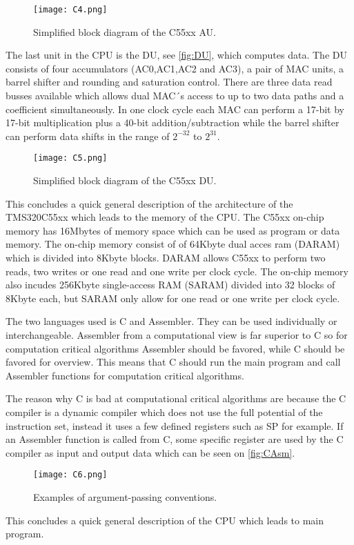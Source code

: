 \begin{figure}[H]
\centering
\texttt{[image: C4.png]}
\label{fig:AU}
\caption{Simplified block diagram of the C55xx AU.}
\end{figure}
The last unit in the CPU is the DU, see \autoref{fig:DU}, which computes data. The DU consists of four accumulators (AC0,AC1,AC2 and AC3), a pair of MAC units, a barrel shifter and rounding and saturation control. There are three data read busses available which allows dual MAC´s access to up to two data paths and a coefficient simultaneously. In one clock cycle each MAC can perform a 17-bit by 17-bit multiplication plus a 40-bit addition/subtraction while the barrel shifter can perform data shifts in the range of $2^{-32}$ to $2^{31}$. 
\begin{figure}[H]
\centering
\texttt{[image: C5.png]}
\label{fig:DU}
\caption{Simplified block diagram of the C55xx DU.}
\end{figure}
This concludes a quick general description of the architecture of the TMS320C55xx which leads to the memory of the CPU. The C55xx on-chip memory has 16Mbytes of memory space which can be used as program or data memory. The on-chip memory consist of of 64Kbyte dual acces ram (DARAM) which is divided into 8Kbyte blocks. DARAM allows C55xx to perform two reads, two writes or one read and one write per clock cycle. The on-chip memory also incudes 256Kbyte single-access RAM (SARAM) divided into 32 blocks of 8Kbyte each, but SARAM only allow for one read or one write per clock cycle.

The two languages used is C and Assembler. They can be used individually or interchangeable. Assembler from a computational view is far superior to C so for computation critical algorithms Assembler should be favored, while C should be favored for overview. This means that C should run the main program and call Assembler functions for computation critical algorithms. 

The reason why C is bad at computational critical algorithms are because the C compiler is a dynamic compiler which does not use the full potential of the instruction set, instead it uses a few defined registers such as SP for example. If an Assembler function is called from C, some specific register are used by the C compiler as input and output data which can be seen on \autoref{fig:CAsm}.
\begin{figure}[H]
\centering
\texttt{[image: C6.png]}
\label{fig:CAsm}
\caption{Examples of argument-passing conventions.}
\end{figure}
This concludes a quick general description of the CPU which leads to main program.
